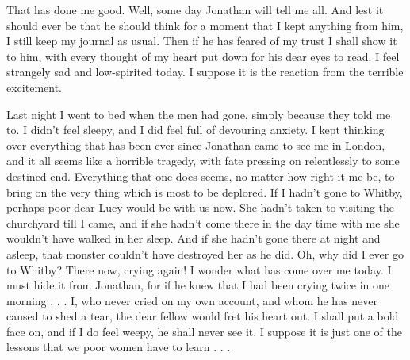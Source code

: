 That has done me good. Well, some day Jonathan will tell me all. And lest it should ever be that he should think for a moment that I kept anything from him, I still keep my journal as usual. Then if he has feared of my trust I shall show it to him, with every thought of my heart put down for his dear eyes to read. I feel strangely sad and low-spirited today. I suppose it is the reaction from the terrible excitement. 

Last night I went to bed when the men had gone, simply because they told me to. I didn't feel sleepy, and I did feel full of devouring anxiety. I kept thinking over everything that has been ever since Jonathan came to see me in London, and it all seems like a horrible tragedy, with fate pressing on relentlessly to some destined end. Everything that one does seems, no matter how right it me be, to bring on the very thing which is most to be deplored. If I hadn't gone to Whitby, perhaps poor dear Lucy would be with us now. She hadn't taken to visiting the churchyard till I came, and if she hadn't come there in the day time with me she wouldn't have walked in her sleep. And if she hadn't gone there at night and asleep, that monster couldn't have destroyed her as he did. Oh, why did I ever go to Whitby? There now, crying again! I wonder what has come over me today. I must hide it from Jonathan, for if he knew that I had been crying twice in one morning . . . I, who never cried on my own account, and whom he has never caused to shed a tear, the dear fellow would fret his heart out. I shall put a bold face on, and if I do feel weepy, he shall never see it. I suppose it is just one of the lessons that we poor women have to learn . . . 

